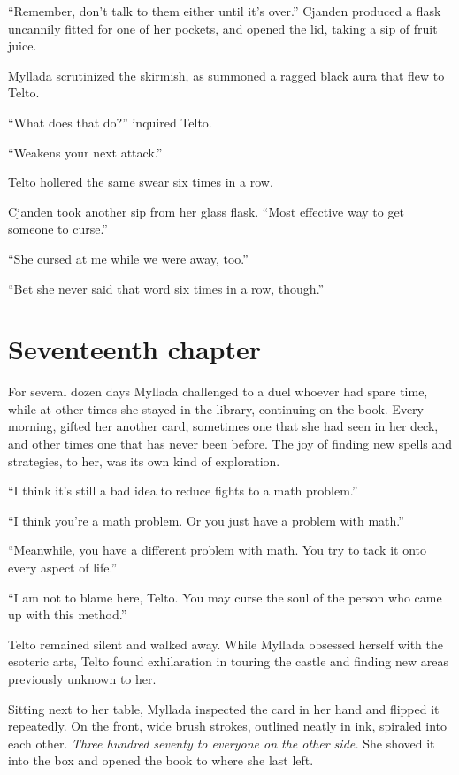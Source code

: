 ``Remember, don't talk to them either until it's over.'' Cjanden produced a flask uncannily fitted for one of her pockets, and opened the lid, taking a sip of fruit juice.

Myllada scrutinized the skirmish, as \yronsyncra summoned a ragged black aura that flew to Telto.

``What does that do?'' inquired Telto.

``Weakens your next attack.''

Telto hollered the same swear six times in a row.

Cjanden took another sip from her glass flask. ``Most effective way to get someone to curse.''

``She cursed at me while we were away, too.''

``Bet she never said that word six times in a row, though.''

\chapter{Seventeenth chapter}

For several dozen days Myllada challenged to a duel whoever had spare time, while at other times she stayed in the library, continuing on the book. Every morning, \yronsyncra{} gifted her another card, sometimes one that she had seen in her deck, and other times one that has never been before. The joy of finding new spells and strategies, to her, was its own kind of exploration.

``I think it's still a bad idea to reduce fights to a math problem.''

``I think you're a math problem. Or you just have a problem with math.''

``Meanwhile, you have a different problem with math. You try to tack it onto every aspect of life.''

``I am not to blame here, Telto. You may curse the soul of the person who came up with this method.''

Telto remained silent and walked away. While Myllada obsessed herself with the esoteric arts, Telto found exhilaration in touring the castle and finding new areas previously unknown to her.

Sitting next to her table, Myllada inspected the card in her hand and flipped it repeatedly. On the front, wide brush strokes, outlined neatly in ink, spiraled into each other. \emph{Three hundred seventy to everyone on the other side.} She shoved it into the box and opened the book to where she last left.

